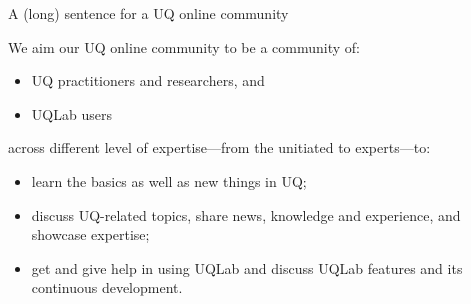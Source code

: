 \documentclass[]{rsuqbeamernew}
\newcommand{\tabitem}{~~\llap{\textbullet}~~}
\begin{document}
\begin{frame}[t]{A (long) sentence for a UQ online community}

We aim our UQ online community to be a community of:

\begin{itemize}
  \item UQ practitioners and researchers, and
  \item UQLab users
\end{itemize}

across different level of expertise---from the unitiated to experts---to:

\begin{itemize}
  \item learn the basics as well as new things in UQ;
  \item discuss UQ-related topics, share news, knowledge and experience, and showcase expertise;
  \item get and give help in using UQLab and discuss UQLab features and its continuous development.
\end{itemize}


  
  
  


\end{frame}
\end{document}
